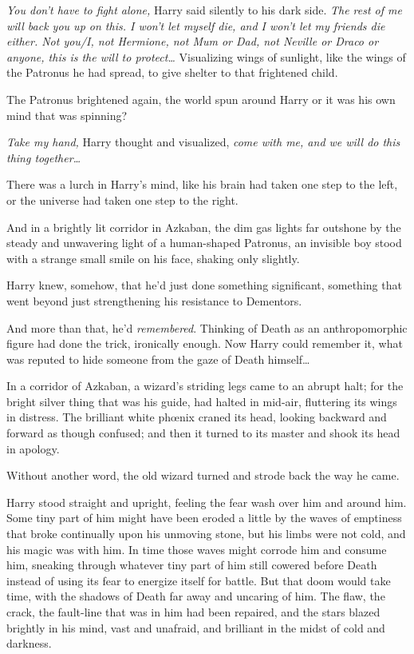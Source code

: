 \emph{You don't have to fight alone,} Harry said silently to his dark side. \emph{The rest of me will back you up on this. I won't let myself die, and I won't let my friends die either. Not you/I, not Hermione, not Mum or Dad, not Neville or Draco or anyone, this is the will to protect{\ldots}} Visualizing wings of sunlight, like the wings of the Patronus he had spread, to give shelter to that frightened child.

The Patronus brightened again, the world spun around Harry or it was his own mind that was spinning?

\emph{Take my hand,} Harry thought and visualized, \emph{come with me, and we will do this thing together{\ldots}}

There was a lurch in Harry's mind, like his brain had taken one step to the left, or the universe had taken one step to the right.

And in a brightly lit corridor in Azkaban, the dim gas lights far outshone by the steady and unwavering light of a human-shaped Patronus, an invisible boy stood with a strange small smile on his face, shaking only slightly.

Harry knew, somehow, that he'd just done something significant, something that went beyond just strengthening his resistance to Dementors.

And more than that, he'd \emph{remembered}. Thinking of Death as an anthropomorphic figure had done the trick, ironically enough. Now Harry could remember it, what was reputed to hide someone from the gaze of Death himself{\ldots}

\later

In a corridor of Azkaban, a wizard's striding legs came to an abrupt halt; for the bright silver thing that was his guide, had halted in mid-air, fluttering its wings in distress. The brilliant white phœnix craned its head, looking backward and forward as though confused; and then it turned to its master and shook its head in apology.

Without another word, the old wizard turned and strode back the way he came.

\later

Harry stood straight and upright, feeling the fear wash over him and around him. Some tiny part of him might have been eroded a little by the waves of emptiness that broke continually upon his unmoving stone, but his limbs were not cold, and his magic was with him. In time those waves might corrode him and consume him, sneaking through whatever tiny part of him still cowered before Death instead of using its fear to energize itself for battle. But that doom would take time, with the shadows of Death far away and uncaring of him. The flaw, the crack, the fault-line that was in him had been repaired, and the stars blazed brightly in his mind, vast and unafraid, and brilliant in the midst of cold and darkness.

